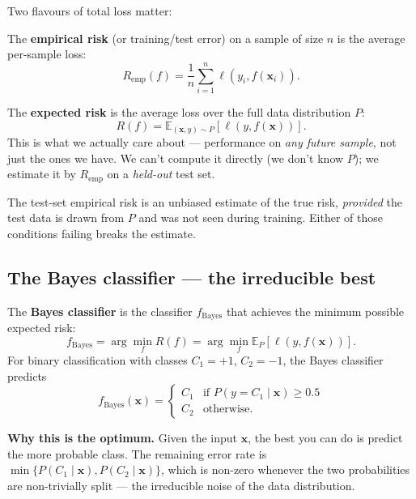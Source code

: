 \documentclass[11pt, a4paper]{article}
\begin{document}
Two flavours of total loss matter:

\begin{defbox}
The \textbf{empirical risk} (or training/test error) on a sample of size $n$ is the average per-sample loss:
\[
R_{\text{emp}}(f) = \frac{1}{n}\sum_{i=1}^n \ell(y_i, f(\mathbf{x}_i)).
\]
\end{defbox}

\begin{defbox}
The \textbf{expected risk} is the average loss over the full data distribution $P$:
\[
R(f) = \mathbb{E}_{(\mathbf{x},y) \sim P}[\ell(y, f(\mathbf{x}))].
\]
This is what we actually care about — performance on \emph{any future sample}, not just the ones we have. We can't compute it directly (we don't know $P$); we estimate it by $R_{\text{emp}}$ on a \emph{held-out} test set.
\end{defbox}

The test-set empirical risk is an unbiased estimate of the true risk, \emph{provided} the test data is drawn from $P$ and was not seen during training. Either of those conditions failing breaks the estimate.

\subsection{The Bayes classifier — the irreducible best}

\begin{defbox}
The \textbf{Bayes classifier} is the classifier $f_{\text{Bayes}}$ that achieves the minimum possible expected risk:
\[
f_{\text{Bayes}} = \arg\min_f R(f) = \arg\min_f \mathbb{E}_P[\ell(y, f(\mathbf{x}))].
\]
For binary classification with classes $C_1 = +1$, $C_2 = -1$, the Bayes classifier predicts
\[
f_{\text{Bayes}}(\mathbf{x}) = \begin{cases} C_1 & \text{if } P(y = C_1 \mid \mathbf{x}) \ge 0.5 \\ C_2 & \text{otherwise}. \end{cases}
\]
\end{defbox}

\textbf{Why this is the optimum.} Given the input $\mathbf{x}$, the best you can do is predict the more probable class. The remaining error rate is $\min\{P(C_1 \mid \mathbf{x}), P(C_2 \mid \mathbf{x})\}$, which is non-zero whenever the two probabilities are non-trivially split — the irreducible noise of the data distribution.
\end{document}
